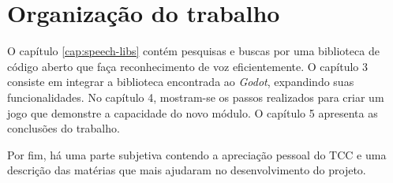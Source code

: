 
\section{Organização do trabalho}

O capítulo \ref{cap:speech-libs} contém pesquisas e buscas por uma biblioteca de
código aberto que faça reconhecimento de voz eficientemente. O capítulo 3 consiste
em integrar a biblioteca encontrada ao \emph{Godot}, expandindo suas
funcionalidades. No capítulo 4, mostram-se os passos realizados para criar um jogo
que demonstre a capacidade do novo módulo. O capítulo 5 apresenta as conclusões do
trabalho.

Por fim, há uma parte subjetiva contendo a apreciação pessoal do TCC e uma descrição
das matérias que mais ajudaram no desenvolvimento do projeto.
